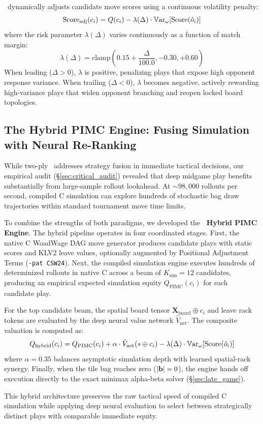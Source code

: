 \algo\ dynamically adjusts candidate move scores using a continuous volatility penalty:
\begin{equation}
    \label{eq:volatility}
    \mathrm{Score}_{\mathrm{adj}}(c_i) = Q(c_i) - \lambda(\Delta) \cdot \mathbb{V}\mathrm{ar}_{\omega}[\mathrm{Score}(\hat{o}_i)]
\end{equation}
where the risk parameter $\lambda(\Delta)$ varies continuously as a function of match margin:
\begin{equation}
    \lambda(\Delta) = \mathrm{clamp}\left(0.15 + \frac{\Delta}{100.0}, -0.30, +0.60\right)
\end{equation}
When leading ($\Delta > 0$), $\lambda$ is positive, penalizing plays that expose high opponent response variance. When trailing ($\Delta < 0$), $\lambda$ becomes negative, actively rewarding high-variance plays that widen opponent branching and reopen locked board topologies.

\subsection{The Hybrid PIMC Engine: Fusing Simulation with Neural Re-Ranking}
\label{sec:hybrid_pimc}

While two-ply \bams\ addresses strategy fusion in immediate tactical decisions, our empirical audit (\S\ref{sec:critical_audit}) revealed that deep midgame play benefits substantially from large-sample rollout lookahead. At $\sim 98,000$ rollouts per second, compiled C simulation can explore hundreds of stochastic bag draw trajectories within standard tournament move time limits.

To combine the strengths of both paradigms, we developed the \textbf{\algo\ Hybrid PIMC Engine}. The hybrid pipeline operates in four coordinated stages. First, the native C WoadWage DAG move generator produces candidate plays with static scores and KLV2 leave values, optionally augmented by Positional Adjustment Terms (\texttt{-pat CSW24}). Next, the compiled simulation engine executes hundreds of determinized rollouts in native C across a beam of $K_{\mathrm{sim}} = 12$ candidates, producing an empirical expected simulation equity $Q_{\mathrm{PIMC}}(c_i)$ for each candidate play.

For the top candidate beam, the spatial board tensor $\mathbf{X}_{\mathrm{board}} \oplus c_i$ and leave rack tokens are evaluated by the deep neural value network $\hat{V}_{\mathrm{net}}$. The composite valuation is computed as:
\begin{equation}
    \label{eq:hybrid_formula}
    Q_{\mathrm{hybrid}}(c_i) = Q_{\mathrm{PIMC}}(c_i) + \alpha \cdot \hat{V}_{\mathrm{net}}(s \oplus c_i) - \lambda(\Delta) \cdot \mathbb{V}\mathrm{ar}_{\omega}[\mathrm{Score}(\hat{o}_i)]
\end{equation}
where $\alpha = 0.35$ balances asymptotic simulation depth with learned spatial-rack synergy. Finally, when the tile bag reaches zero ($|\mathbf{b}| = 0$), the engine hands off execution directly to the exact minimax alpha-beta solver (\S\ref{sec:late_game}).

This hybrid architecture preserves the raw tactical speed of compiled C simulation while applying deep neural evaluation to select between strategically distinct plays with comparable immediate equity.
